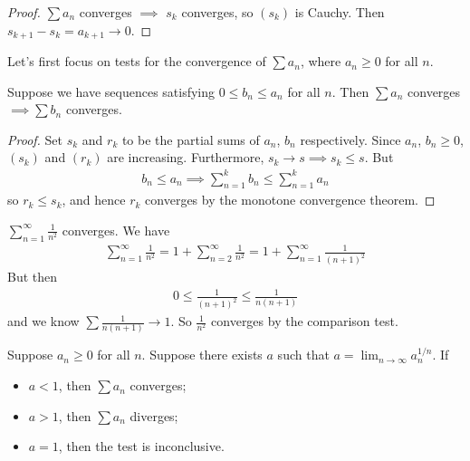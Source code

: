 \documentclass{../template/note}
\begin{document}
    \begin{proof}
        \(\sum a_n\) converges \(\implies\) \(s_k\) converges, so \((s_k)\) is Cauchy. Then \(s_{k+1} - s_k = a_{k+1} \to 0\).
    \end{proof}
    
    Let's first focus on tests for the convergence of \(\sum a_n\), where \(a_n \geq 0\) for all \(n\).

    \begin{proposition}
        Suppose we have sequences satisfying \(0 \leq b_n \leq a_n\) for all \(n\). Then \(\sum a_n\) converges \(\implies \sum b_n\) converges.
    \end{proposition}
    
    \begin{proof}
        Set \(s_k\) and \(r_k\) to be the partial sums of \(a_n\), \(b_n\) respectively. Since \(a_n\), \(b_n \geq 0\), \((s_k)\) and \((r_k)\) are increasing. Furthermore, \(s_k \to s \implies s_k \leq s\). But      
        \begin{align*}
            b_n \leq a_n \implies \sum_{n=1}^k b_n \leq \sum_{n=1}^k a_n
        \end{align*}
        so \(r_k \leq s_k\), and hence \(r_k\) converges by the monotone convergence theorem.
    \end{proof}
    
    \begin{example}
        \(\sum_{n=1}^\infty \frac 1 {n^2}\) converges. We have
        \begin{align*}
            \sum_{n=1}^\infty \frac 1 {n^2} = 1 + \sum_{n=2}^\infty \frac 1 {n^2} = 1 + \sum_{n=1}^\infty \frac 1 {(n+1)^2}
        \end{align*}
        But then
        \begin{align*}
            0 \leq \frac 1 {(n+1)^2} \leq \frac 1 {n(n+1)}
        \end{align*}
        and we know \(\sum \frac 1 {n(n+1)} \to 1\). So \(\frac 1 {n^2}\) converges by the comparison test.
    \end{example}
    
    \begin{proposition}
        Suppose \(a_n \geq 0\) for all \(n\). Suppose there exists \(a\) such that \(a = \lim_{n \to \infty} a_n^{1/n}\). If
        \begin{itemize}
            \item \(a < 1\), then \(\sum a_n\) converges;
            \item \(a > 1\), then \(\sum a_n\) diverges;
            \item \(a = 1\), then the test is inconclusive.
        \end{itemize}
    \end{proposition}
    
\end{document}
